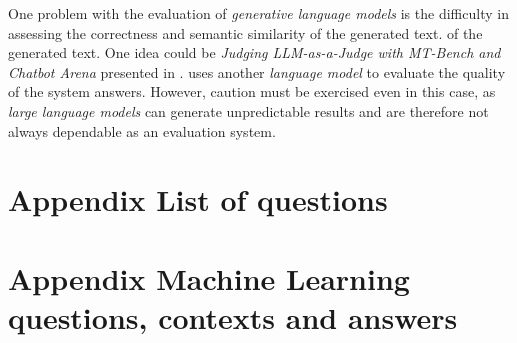 \documentclass{article}
\begin{document}
One problem with the evaluation of \textit{generative language models} is the difficulty in assessing the correctness and semantic similarity of the generated text. of the generated text. One idea could be \textit{Judging LLM-as-a-Judge with MT-Bench and Chatbot Arena} presented in \cite{judge}. \cite{judge} uses another \textit{language model} to evaluate the quality of the system answers. However, caution must be exercised even in this case, as \textit{large language models} can generate unpredictable results and are therefore not always dependable as an evaluation system.

\newpage




\newpage

\appendix
\section{Appendix List of questions}\label{appendix_a}

\newpage
\section{Appendix Machine Learning questions, contexts and answers}\label{appendix_b}
%

\newpage


\end{document}
